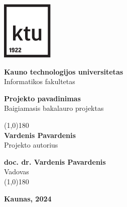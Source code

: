 \thispagestyle{noNumber}
\begin{center}
\includegraphics[width=2.46cm]{ktu.pdf}
\vspace{0.3cm}

\normalsize{\textbf{Kauno technologijos universitetas}} \\
Informatikos fakultetas

\vspace{5cm}

\Large \textbf{Projekto pavadinimas} \\
\large
Baigiamasis bakalauro projektas

\vspace{3cm}

\normalsize
{\color{lines_name} \line(1,0){180}}\\
\vspace{0.5cm}
\textbf{Vardenis Pavardenis} \\
Projekto autorius

\vspace{1cm}

\textbf{doc. dr. Vardenis Pavardenis} \\
Vadovas\\
\vspace{0.5cm}
{\color{lines_name} \line(1,0){180}}\\
\vfill

\textbf{Kaunas, 2024}

\end{center}
